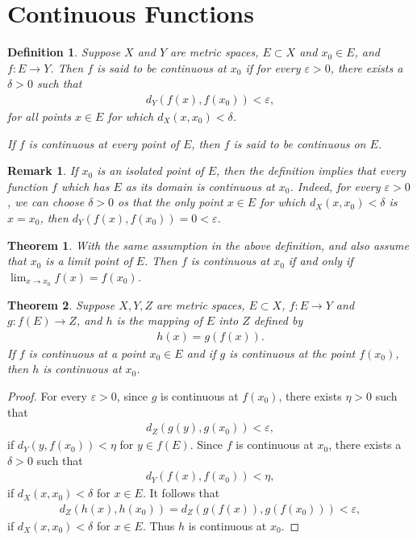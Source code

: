 \documentclass[11pt]{book}
\newtheorem{definition}{Definition}[chapter]
\newtheorem{theorem}{Theorem}[chapter]
\newtheorem{remark}{Remark}[chapter]
\theoremstyle{definition}
\numberwithin{equation}{chapter}
\begin{document}
\medskip



\section{Continuous Functions}

\begin{definition}
Suppose $X$ and $Y$ are metric spaces, $E \subset X$ and $x_0 \in E$, and $f: E \to Y$. Then $f$ is said to be continuous at $x_0$ if for every $\varepsilon > 0$, there exists a $\delta > 0$ such that 
\begin{align*}
    d_Y(f(x),f(x_0)) < \varepsilon,
\end{align*}
for all points $x \in E$ for which $d_X(x,x_0) < \delta$. 

If $f$ is continuous at every point of $E$, then $f$ is said to be continuous on $E$.
\end{definition}

\begin{remark}
If $x_0$ is an isolated point of $E$, then the definition implies that every function $f$ which has $E$ as its domain is continuous at $x_0$. Indeed, for every $\varepsilon > 0$, we can choose $\delta > 0$ os that the only point $x \in E$ for which $d_X(x,x_0) < \delta$ is $x = x_0$, then $d_Y(f(x),f(x_0)) = 0 < \varepsilon$.
\end{remark}

\medskip

\begin{theorem}
With the same assumption in the above definition, and also assume that $x_0$ is a limit point of $E$. Then $f$ is continuous at $x_0$ if and only if $\lim_{x\to x_0} f(x) = f(x_0)$.
\end{theorem}

\medskip

\begin{theorem}
Suppose $X, Y, Z$ are metric spaces, $E \subset X$, $f: E \to Y$ and $g: f(E) \to Z$, and $h$ is the mapping of $E$ into $Z$ defined by
\begin{align*}
    h(x) = g(f(x)).
\end{align*}
If $f$ is continuous at a point $x_0 \in E$ and if $g$ is continuous at the point $f(x_0)$, then $h$ is continuous at $x_0$.
\end{theorem}
\begin{proof}
For every $\varepsilon > 0$, since $g$ is continuous at $f(x_0)$, there exists $\eta > 0$ such that 
\begin{align*}
    d_Z(g(y),g(x_0)) < \varepsilon,
\end{align*}
if $d_Y(y,f(x_0)) < \eta$ for $y \in f(E)$. Since $f$ is continuous at $x_0$, there exists a $\delta > 0$ such that
\begin{align*}
    d_Y(f(x),f(x_0)) < \eta,
\end{align*}
if $d_X(x,x_0) < \delta$ for $x \in E$. It follows that
\begin{align*}
    d_Z(h(x),h(x_0)) = d_Z(g(f(x)), g(f(x_0))) < \varepsilon,
\end{align*}
if $d_X(x,x_0) < \delta$ for $x \in E$. Thus $h$ is continuous at $x_0$.
\end{proof}
\end{document}

